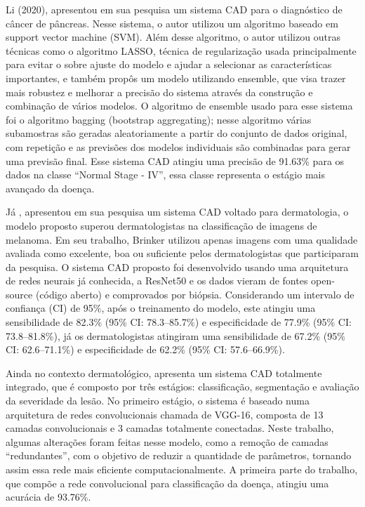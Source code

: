 Li (2020), apresentou em sua pesquisa um sistema CAD para o diagnóstico de câncer de pâncreas. Nesse sistema, o autor utilizou um algoritmo baseado em support vector machine (SVM). Além desse algoritmo, o autor utilizou outras técnicas como o algoritmo LASSO, técnica de regularização usada principalmente para evitar o sobre ajuste do modelo e ajudar a selecionar as características importantes, e também propôs um modelo utilizando ensemble, que visa trazer mais robustez e melhorar a precisão do sistema através da construção e combinação de vários modelos. O algoritmo de ensemble usado para esse sistema foi o algoritmo bagging (bootstrap aggregating); nesse algoritmo várias subamostras são geradas aleatoriamente a partir do conjunto de dados original, com repetição e as previsões dos modelos individuais são combinadas para gerar uma previsão final. Esse sistema CAD atingiu uma precisão de 91.63\% para os dados na classe “Normal Stage - IV”, essa classe representa o estágio mais avançado da doença.

Já , apresentou em sua pesquisa um sistema CAD voltado para dermatologia, o modelo proposto superou dermatologistas na classificação de imagens de melanoma. Em seu trabalho, Brinker utilizou apenas imagens com uma qualidade avaliada como excelente, boa ou suficiente  pelos dermatologistas que participaram da pesquisa. O sistema CAD proposto foi desenvolvido usando uma arquitetura de redes neurais já conhecida, a ResNet50 e os dados vieram de fontes open-source (código aberto) e comprovados por biópsia. Considerando um intervalo de confiança (CI) de 95\%, após o treinamento do modelo, este atingiu uma sensibilidade de 82.3\% (95\% CI: 78.3–85.7\%) e especificidade de 77.9\% (95\% CI: 73.8–81.8\%), já os dermatologistas atingiram uma sensibilidade de 67.2\% (95\% CI: 62.6–71.1\%) e especificidade de 62.2\% (95\% CI: 57.6–66.9\%).


Ainda no contexto dermatológico, \citeauthor{DASH2020106240} apresenta um sistema CAD totalmente integrado, que é composto por três estágios: classificação, segmentação e avaliação da severidade da lesão. No primeiro estágio, o sistema é baseado numa arquitetura de redes convolucionais chamada de VGG-16, composta de 13 camadas convolucionais e 3 camadas totalmente conectadas. Neste trabalho, algumas alterações foram feitas nesse modelo, como a remoção de camadas “redundantes”, com o objetivo de reduzir a quantidade de parâmetros, tornando assim essa rede mais eficiente computacionalmente. A primeira parte do trabalho, que compõe a rede convolucional para classificação da doença, atingiu uma acurácia de 93.76\%.


